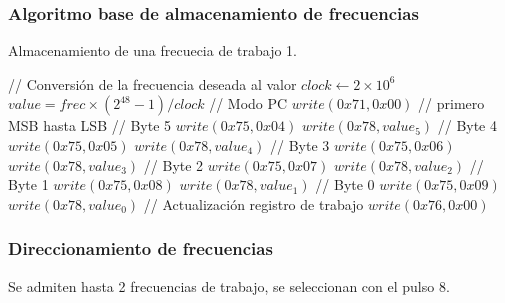 \subsubsection{Algoritmo base de almacenamiento de frecuencias}
\begin{algorithm}[H]
    \caption{Almacenamiento de una frecuecia de trabajo 1.}\label{algo_frec}
    \begin{algorithmic}[1]
    \State // {Conversi\'on de la frecuencia deseada al valor}
    \State $clock \gets 2 \times 10^{6}$
    \State $value = frec \times (2^{48} -1 ) / clock $
    \State // {Modo PC}
    \State $write(0x71, 0x00)$
    \State // {primero MSB hasta LSB}
    \State // {Byte 5}
    \State $write(0x75, 0x04)$ 
    \State $write(0x78, value_5)$
    \State // {Byte 4}
    \State $write(0x75, 0x05)$ 
    \State $write(0x78, value_4)$
    \State // {Byte 3}
    \State $write(0x75, 0x06)$ 
    \State $write(0x78, value_3)$
    \State // {Byte 2}
    \State $write(0x75, 0x07)$ 
    \State $write(0x78, value_2)$
    \State // {Byte 1}
    \State $write(0x75, 0x08)$ 
    \State $write(0x78, value_1)$
    \State // {Byte 0}
    \State $write(0x75, 0x09)$ 
    \State $write(0x78, value_0)$
    \State // {Actualizaci\'on registro de trabajo}
    \State $write(0x76, 0x00)$
    \EndProcedure
    \end{algorithmic}
\end{algorithm}

\subsubsection{Direccionamiento de frecuencias}
Se admiten hasta 2 frecuencias de trabajo, se seleccionan con el pulso 8.

\newpage
